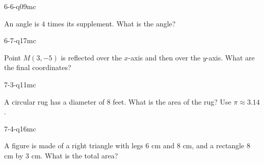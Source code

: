 \begin{practiceQuestion}{6-6-q09}{mc}
\begin{questionText}
An angle is $4$ times its supplement. What is the angle?
\end{questionText}
\end{practiceQuestion}

\begin{practiceQuestion}{6-7-q17}{mc}
\begin{questionText}
Point $M(3, -5)$ is reflected over the $x$-axis and then over the $y$-axis. What are the final coordinates?
\end{questionText}
\end{practiceQuestion}

\begin{practiceQuestion}{7-3-q11}{mc}
\begin{questionText}
A circular rug has a diameter of $8$ feet. What is the area of the rug? Use $\pi \approx 3.14$.
\end{questionText}
\end{practiceQuestion}

\begin{practiceQuestion}{7-4-q16}{mc}
\begin{questionText}
A figure is made of a right triangle with legs $6$ cm and $8$ cm, and a rectangle $8$ cm by $3$ cm. What is the total area?
\end{questionText}
\end{practiceQuestion}

